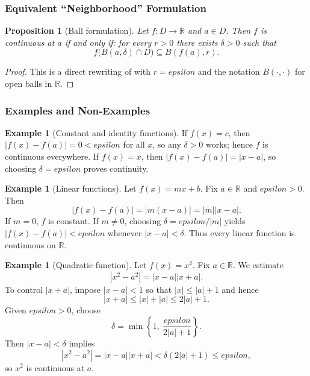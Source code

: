 \documentclass[12pt]{article}
\numberwithin{equation}{section}
\def\abs#1{|#1|}
\def\eps{epsilon}
\newcommand{\RR}{\mathbb{R}}
\DeclarePairedDelimiter{\abs}{\lvert}{\rvert}
\newcommand{\eps}{\varepsilon}               %
\theoremstyle{plain}
\newtheorem{proposition}[theorem]{Proposition}
\theoremstyle{definition}
\newtheorem{example}[theorem]{Example}
\theoremstyle{remark}
\begin{document}
\subsubsection{Equivalent ``Neighborhood'' Formulation}

\begin{proposition}[Ball formulation]\label{prop:cont-ball}
Let $f:D\to\RR$ and $a\in D$. Then $f$ is continuous at $a$ if and only if:
for every $r>0$ there exists $\delta>0$ such that
\[
f\bigl(B(a,\delta)\cap D\bigr)\subseteq B(f(a),r).
\]
\end{proposition}

\begin{proof}
This is a direct rewriting of  with $r=\eps$ and the notation $B(\cdot,\cdot)$ for open balls in $\RR$.
\end{proof}

\subsubsection{Examples and Non-Examples}

\begin{example}[Constant and identity functions]
If $f(x)=c$, then $\abs{f(x)-f(a)}=0<\eps$ for all $x$, so any $\delta>0$ works; hence $f$ is continuous everywhere.
If $f(x)=x$, then $\abs{f(x)-f(a)}=\abs{x-a}$, so choosing $\delta=\eps$ proves continuity.
\end{example}

\begin{example}[Linear functions]
Let $f(x)=mx+b$. Fix $a\in\RR$ and $\eps>0$.
Then
\[
\abs{f(x)-f(a)}=\abs{m(x-a)}=\abs{m}\abs{x-a}.
\]
If $m=0$, $f$ is constant. If $m\neq 0$, choosing $\delta=\eps/\abs{m}$ yields $\abs{f(x)-f(a)}<\eps$ whenever $\abs{x-a}<\delta$.
Thus every linear function is continuous on $\RR$.
\end{example}

\begin{example}[Quadratic function]
Let $f(x)=x^2$. Fix $a\in\RR$.
We estimate
\[
\abs{x^2-a^2}=\abs{x-a}\abs{x+a}.
\]
To control $\abs{x+a}$, impose $\abs{x-a}<1$ so that $\abs{x}\le \abs{a}+1$ and hence
\[
\abs{x+a}\le \abs{x}+\abs{a}\le 2\abs{a}+1.
\]
Given $\eps>0$, choose
\[
\delta=\min\left\{1,\ \frac{\eps}{2\abs{a}+1}\right\}.
\]
Then $\abs{x-a}<\delta$ implies
\[
\abs{x^2-a^2}=\abs{x-a}\abs{x+a}<\delta(2\abs{a}+1)\le \eps,
\]
so $x^2$ is continuous at $a$.
\end{example}
\end{document}
